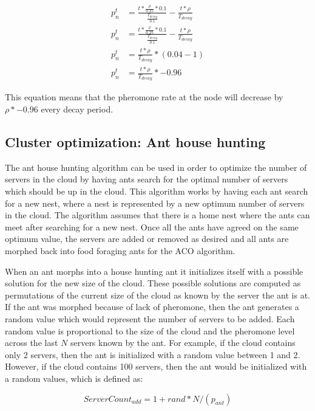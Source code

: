 \begin{equation}
\begin{aligned}
p^{t}_{n} &= \frac{t *  \frac{\rho}{0.25} * 0.1}{\frac{T_{decay}}{0.1}} - \frac{t *  \rho}{T_{decay}} \\
p^{t}_{n} &= \frac{t *  \frac{\rho}{0.25} * 0.1}{\frac{T_{decay}}{0.1}} - \frac{t *  \rho}{T_{decay}} \\
p^{t}_{n} &= \frac{t * \rho}{T_{decay}} * (0.04 - 1) \\
p^{t}_{n} &= \frac{t * \rho}{T_{decay}} * -0.96
\end{aligned}
\end{equation}

This equation means that the pheromone rate at the node will decrease by $\rho * -0.96$ every decay period.

\subsection{Cluster optimization: Ant house hunting}

The ant house hunting algorithm can be used in order to optimize the number of servers in the cloud by having ants search for the optimal number of servers which should be up in the cloud. This algorithm works by having each ant search for a new nest, where a nest is represented by a new optimum number of servers in the cloud. The algorithm assumes that there is a home nest where the ants can meet after searching for a new nest. Once all the ants have agreed on the same optimum value, the servers are added or removed as desired and all ants are morphed back into food foraging ants for the ACO algorithm. \cite{selforg:antreloc}

When an ant morphs into a house hunting ant it initializes itself with a possible solution for the new size of the cloud. These possible solutions are computed as permutations of the current size of the cloud as known by the server the ant is at. If the ant was morphed because of lack of pheromone, then the ant generates a random value which would represent the number of servers to be added. Each random value is proportional to the size of the cloud and the pheromone level across the last $N$ servers known by the ant. For example, if the cloud contains only 2 servers, then the ant is initialized with a random value between 1 and 2. However, if the cloud contains 100 servers, then the ant would be initialized with a random values, which is defined as:

\begin{equation}
ServerCount_{add} = 1 + rand * N / (p_{ant})
\end{equation}

